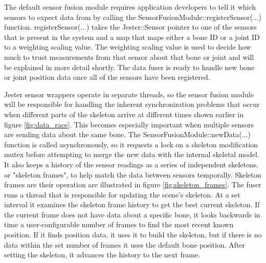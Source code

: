 The default sensor fusion module requires application developers to tell it which sensors to expect data from by calling the SensorFusionModule::registerSensor(...) function. registerSensor(...) takes the Jester::Sensor pointer to one of the sensors that is present in the system and a map that maps either a bone ID or a joint ID to a weighting scaling value. The weighting scaling value is used to decide how much to trust measurements from that sensor about that bone or joint and will be explained in more detail shortly. The data fuser is ready to handle new bone or joint position data once all of the sensors have been registered.

Jester sensor wrappers operate in separate threads, so the sensor fusion module will be responsible for handling the inherent synchronization problems that occur when different parts of the skeleton arrive at different times shown earlier in figure \ref{fig:data_race}. This becomes especially important when multiple sensors are sending data about the same bone. The SensorFusionModule::newData(...) function is called asynchronously, so it requests a lock on a skeleton modification mutex before attempting to merge the new data with the internal skeletal model. It also keeps a history of the sensor readings as a series of independent skeletons, or "skeleton frames", to help match the data between sensors temporally. Skeleton frames are their operation are illustrated in figure \ref{fig:skeleton_frames}. The fuser runs a thread that is responsible for updating the scene's skeleton. At a set interval it examines the skeleton frame history to get the best current skeleton. If the current frame does not have data about a specific bone, it looks backwards in time a user-configurable number of frames to find the most recent known position. If it finds position data, it uses it to build the skeleton, but if there is no data within the set number of frames it uses the default bone position. After setting the skeleton, it advances the history to the next frame. 

